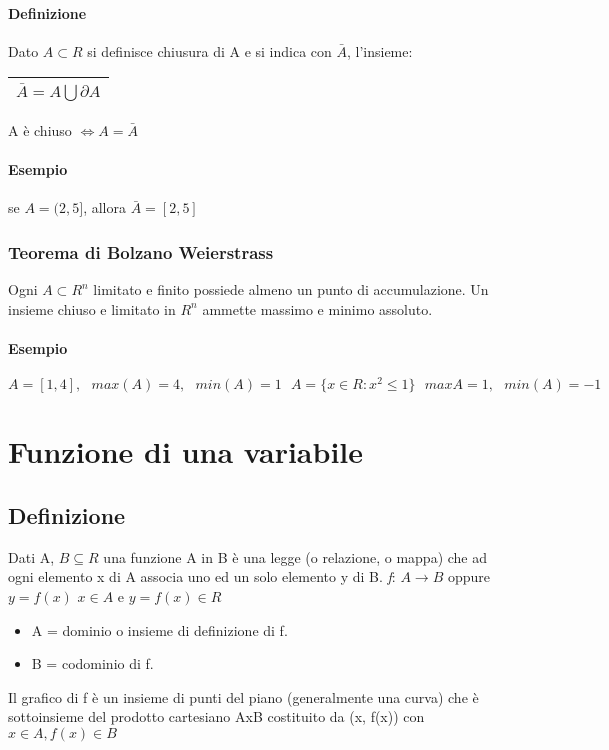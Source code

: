 \paragraph{Definizione}
Dato $A\subset R$ si definisce chiusura di A e si indica con $\bar{A}$,
l'insieme:
\begin{tabular}{|c|}
	\hline
	$\bar{A}=A\bigcup \partial A$\\
	\hline
\end{tabular} A è chiuso $\Leftrightarrow A=\bar{A}$
\paragraph{Esempio} se $A=(2,5]$, allora $\bar{A}=[2,5]$
\subsubsection{Teorema di Bolzano Weierstrass}
Ogni $A\subset R^n$ limitato e finito possiede almeno un punto di
accumulazione. Un insieme chiuso e limitato in $R^n$ ammette massimo e minimo
assoluto.
\paragraph{Esempio} $A=[1,4],\text{ } max(A)=4,\text{ } min(A)=1 \text{ }
A=\{x\in R:x^2\leq 1\} \text{ } max{A}=1, \text{ } min(A)=-1$
\section{Funzione di una variabile}
\subsection{Definizione}
Dati A, $B\subseteq R$ una funzione A in B è una legge (o relazione, o mappa)
che ad ogni elemento x di A associa uno ed un solo elemento y di B.
\textit{f}: $A\to B$ oppure $y=f(x)$ $x\in A$ e $y=f(x)\in R$
\begin{itemize}
	\item A = dominio o insieme di definizione di f.
	\item B = codominio di f.
\end{itemize}
\begin{figure}[!ht]
	\begin{tikzpicture}

	\end{tikzpicture}

\end{figure}
Il grafico di f è un insieme di punti del piano (generalmente una curva) che è
sottoinsieme del prodotto cartesiano AxB costituito da (x, f(x)) con $x\in A,
f(x)\in B$
